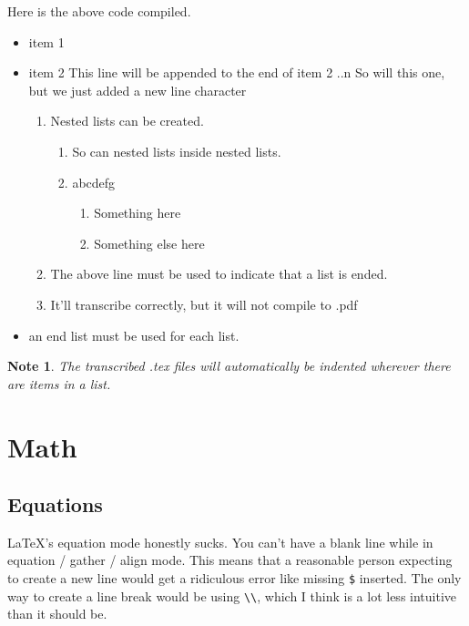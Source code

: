 \documentclass[12pt]{article}
\newcommand{\nl}{\\}
\newtheorem{Note}[Lemma]{Note}
\begin{document}
\begin{flushleft}
Here is the above code compiled. \nl
\begin{itemize}[label=--]
    \item item 1
    \item item 2
    This line will be appended to the end of item 2
    ..n So will this one, but we just added a new line character
    \begin{enumerate}[label=\alph*)]
        \item Nested lists can be created.
        \begin{enumerate}[label=(\roman*)]
            \item So can nested lists inside nested lists.
            \item abcdefg
            \begin{enumerate}[label=.\arabic*.]
                \item Something here
                \item Something else here
            \end{enumerate}
        \end{enumerate}
        \item The above line must be used to indicate that a list is ended.
        \item It'll transcribe correctly, but it will not compile to .pdf
    \end{enumerate}
    \item an end list must be used for each list.
\end{itemize}

\begin{Note}
The transcribed .tex files will automatically be indented wherever there are items in a list.
\end{Note}

\newpage

\section*{Math}

\subsection*{Equations}

LaTeX's equation mode honestly sucks. You can't have a blank line while in equation / gather / align mode. This means that a reasonable person expecting to create a new line would get a ridiculous error like missing \verb|$| inserted. The only way to create a line break would be using \verb|\\|, which I think is a lot less intuitive than it should be.


\end{flushleft}
\end{document}
